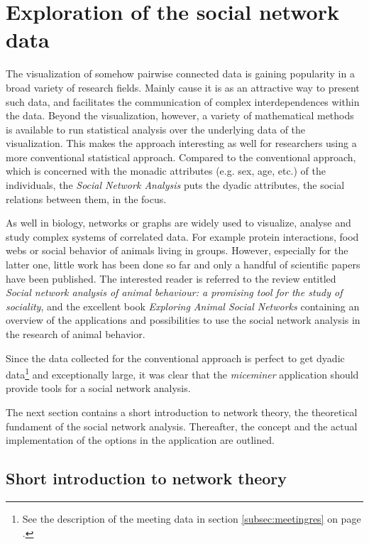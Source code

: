 \section{Exploration of the social network data}
\label{sec:graph}

The visualization of somehow pairwise connected data is gaining popularity in a broad variety of research fields. Mainly cause it is as an attractive way to present such data, and facilitates the communication of complex interdependences within the data. Beyond the visualization, however, a variety of mathematical methods is available to run statistical analysis over the underlying data of the visualization. This makes the approach interesting as well for researchers using a more conventional statistical approach. Compared to the conventional approach, which is concerned with the monadic attributes (e.g. sex, age, etc.) of the individuals, the \textit{Social Network Analysis} puts the dyadic attributes, the social relations between them, in the focus.

As well in biology, networks or graphs are widely used to visualize, analyse and study complex systems of correlated data. For example protein interactions, food webs or social behavior of animals living in groups. However, especially for the latter one, little work has been done so far and only a handful of scientific papers have been published. The interested reader is referred to the review entitled \textit{Social network analysis of animal behaviour: a promising 
tool for the study of sociality}\cite{wey:08}, and the excellent book \textit{Exploring Animal Social Networks}\cite{croft:07} containing an overview of the applications and possibilities to use the social network analysis in the research of animal behavior.

Since the data collected for the conventional approach is perfect to get dyadic data\footnote{See the description of the meeting data in section \ref{subsec:meetingres} on page \pageref{subsec:meetingres}.} and exceptionally large, it was clear that the \textit{miceminer} application should provide tools for a social network analysis.

The next section contains a short introduction to network theory, the theoretical fundament of the social network analysis. Thereafter, the concept and the actual implementation of the options in the application are outlined.  

\subsection{Short introduction to network theory}
\label{subsec:graph_intro}

